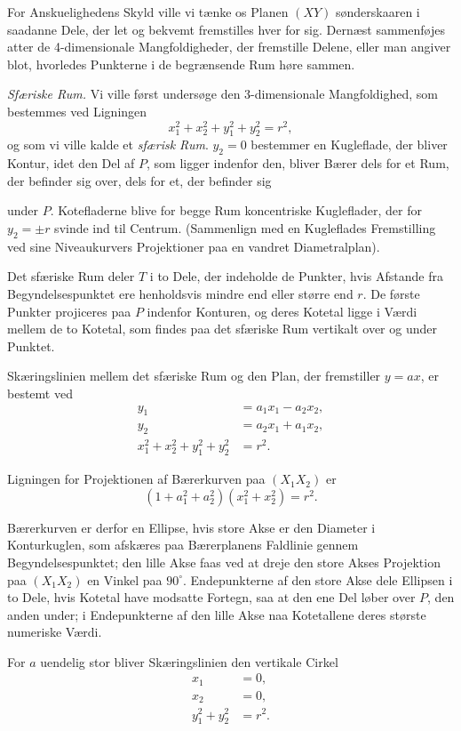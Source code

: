 \documentclass{article}
\begin{document}
For Anskuelighedens Skyld ville vi tænke os Planen $(XY)$ sønderskaaren i saadanne Dele, der let og bekvemt fremstilles hver for sig. Dernæst sammenføjes atter de 4-dimensionale Mangfoldigheder, der fremstille Delene, eller man angiver blot, hvorledes Punkterne i de begrænsende Rum høre sammen.

\emph{Sfæriske Rum.} Vi ville først undersøge den 3-dimensionale Mangfoldighed, som bestemmes ved Ligningen
\[
x_1^2 + x_2^2 + y_1^2 + y_2^2 = r^2,
\]
og som vi ville kalde et \emph{sfærisk Rum}. $y_2 = 0$ bestemmer en Kugleflade, der bliver Kontur, idet den Del af $P$, som ligger indenfor den, bliver Bærer dels for et Rum, der befinder sig over, dels for et, der befinder sig

under $P$. Kotefladerne blive for begge Rum koncentriske Kugleflader, der for $y_2 = \pm r$ svinde ind til Centrum. (Sammenlign med en Kugleflades Fremstilling ved sine Niveaukurvers Projektioner paa en vandret Diametralplan).

Det sfæriske Rum deler $T$ i to Dele, der indeholde de Punkter, hvis Afstande fra Begyndelsespunktet ere henholdsvis mindre end eller større end $r$. De første Punkter projiceres paa $P$ indenfor Konturen, og deres Kotetal ligge i Værdi mellem de to Kotetal, som findes paa det sfæriske Rum vertikalt over og under Punktet.

Skæringslinien mellem det sfæriske Rum og den Plan, der fremstiller $y = ax$, er bestemt ved
\[
\begin{aligned}
y_1 &= a_1 x_1 - a_2 x_2, \\
y_2 &= a_2 x_1 + a_1 x_2, \\
x_1^2 + x_2^2 + y_1^2 + y_2^2 &= r^2.
\end{aligned}
\]

Ligningen for Projektionen af Bærerkurven paa $(X_1 X_2)$ er
\[
(1 + a_1^2 + a_2^2)(x_1^2 + x_2^2) = r^2.
\]

Bærerkurven er derfor en Ellipse, hvis store Akse er den Diameter i Konturkuglen, som afskæres paa Bærerplanens Faldlinie gennem Begyndelsespunktet; den lille Akse faas ved at dreje den store Akses Projektion paa $(X_1 X_2)$ en Vinkel paa $90^\circ$. Endepunkterne af den store Akse dele Ellipsen i to Dele, hvis Kotetal have modsatte Fortegn, saa at den ene Del løber over $P$, den anden under; i Endepunkterne af den lille Akse naa Kotetallene deres største numeriske Værdi.

For $a$ uendelig stor bliver Skæringslinien den vertikale Cirkel
\[
\begin{aligned}
x_1 &= 0, \\
x_2 &= 0, \\
y_1^2 + y_2^2 &= r^2.
\end{aligned}
\]
\end{document}
